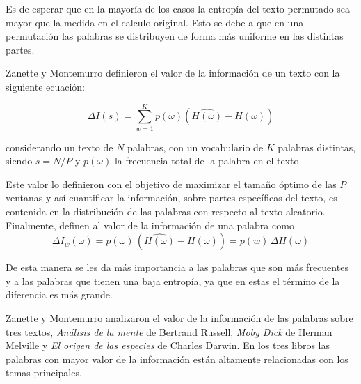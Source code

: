 
Es de esperar que en la mayoría de los casos 
la entropía del texto permutado sea mayor que la medida en el calculo original. Esto 
se debe a que en una permutación las palabras se distribuyen de forma más uniforme 
en las distintas partes.

Zanette y Montemurro definieron el valor de la información de un texto con la siguiente ecuación:

\begin{equation}
  \Delta I(s) = \sum_{w = 1}^{K} p(\omega) (\widehat{H(\omega)} - H(\omega))
\end{equation}

considerando un texto de $N$ palabras, con un vocabulario de $K$ palabras distintas, siendo $s = N/P$ y  $p(\omega)$ la frecuencia total de la palabra en el texto.

Este valor lo definieron con el objetivo de maximizar el tamaño óptimo de las $P$ ventanas y así cuantificar la información, sobre partes específicas del texto, es contenida en la distribución de las palabras con respecto al texto aleatorio.
Finalmente, definen al valor de la información de una palabra como
 \begin{equation}
  \Delta I_w(\omega) = p(\omega) \,  (\widehat{H(\omega)} - H(\omega))  =  p(w) \, \Delta{H(\omega)}
 \end{equation}
 
De esta manera se les da más importancia a las palabras que son más frecuentes y a las palabras que tienen una baja entropía, ya que en estas el término de la diferencia es más grande.

Zanette y Montemurro analizaron el valor de la información de las palabras sobre tres textos, \textit{Análisis de la mente} de Bertrand Russell, 
\textit{Moby Dick} de Herman Melville y \textit{El origen de las especies} de Charles Darwin. 
En los tres libros las palabras con mayor valor de la información están 
altamente relacionadas con los temas principales. 




